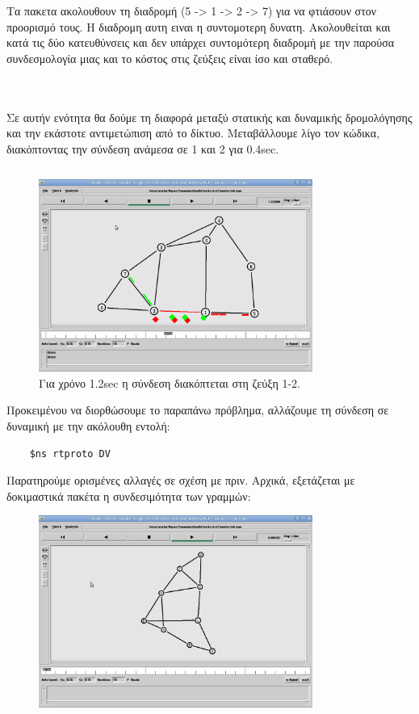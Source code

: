 \documentclass[a4paper,9pt]{article}
\begin{document}
Τα πακετα ακολουθουν τη διαδρομή (5 -> 1 ->  2 -> 7)
για να φτιάσουν στον προορισμό τους. Η διαδρομη αυτη ειναι η συντομοτερη
δυνατη. Ακολουθείται και κατά τις δύο κατευθύνσεις και δεν υπάρχει συντομότερη
διαδρομή με την παρούσα συνδεσμολογία μιας και το κόστος στις ζεύξεις είναι
ίσο και σταθερό.


\inputminted[fontsize=\footnotesize]{tcl}{files/ex3_1.tcl}
\section{}
Σε αυτήν ενότητα θα δούμε τη διαφορά μεταξύ στατικής και δυναμικής
δρομολόγησης και την εκάστοτε αντιμετώπιση από το δίκτυο. Μεταβάλλουμε λίγο
τον κώδικα, διακόπτοντας την σύνδεση ανάμεσα σε 1 και 2 για 0.4sec.

\inputminted[fontsize=\footnotesize]{tcl}{files/ex3_2.tcl}

\begin{figure}[H]
    \centering
    \includegraphics[width=0.8\textwidth]{files/3.png}
    \caption{Για χρόνο 1.2sec η σύνδεση διακόπτεται στη ζεύξη 1-2.}
\end{figure}


Προκειμένου να διορθώσουμε το παραπάνω πρόβλημα, αλλάζουμε τη σύνδεση σε
δυναμική με την ακόλουθη εντολή:
\begin{verbatim}
    $ns rtproto DV
\end{verbatim}

Παρατηρούμε ορισμένες αλλαγές σε σχέση με πριν. Αρχικά, εξετάζεται με
δοκιμαστικά πακέτα η συνδεσιμότητα των γραμμών:
\begin{figure}[H]
    \centering
    \includegraphics[width=0.8\textwidth]{files/4.png}
\end{figure}
\end{document}
